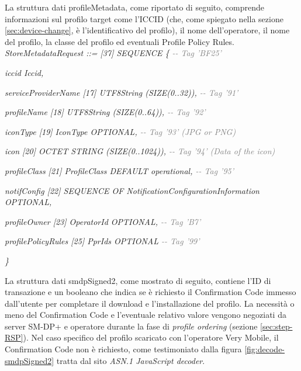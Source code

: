\documentclass[10pt, oneside]{book}
\begin{document}
La struttura dati profileMetadata, come riportato di seguito, comprende informazioni sul profilo target come l'ICCID (che, come spiegato nella sezione \ref{sec:device-change}, è l'identificativo del profilo), il nome dell'operatore, il nome del profilo, la classe del profilo ed eventuali Profile Policy Rules.\\

\textit{StoreMetadataRequest ::= [37] SEQUENCE \{ \textcolor{gray}{{-}{-} Tag 'BF25'}}

\hspace{0.75cm} \textit{iccid Iccid,}

\hspace{0.75cm} \textit{serviceProviderName [17] UTF8String (SIZE(0..32)), \textcolor{gray}{{-}{-} Tag '91'}}

\hspace{0.75cm} \textit{profileName [18] UTF8String (SIZE(0..64)), \textcolor{gray}{{-}{-} Tag '92'}}

\hspace{0.75cm} \textit{iconType [19] IconType OPTIONAL, \textcolor{gray}{{-}{-} Tag '93' (JPG or PNG)}}

\hspace{0.75cm} \textit{icon [20] OCTET STRING (SIZE(0..1024)), \textcolor{gray}{{-}{-} Tag '94' (Data of the icon)}}

\hspace{0.75cm} \textit{profileClass [21] ProfileClass DEFAULT operational, \textcolor{gray}{{-}{-} Tag '95'}}

\hspace{0.75cm} \textit{notifConfig [22] SEQUENCE OF NotificationConfigurationInformation OPTIONAL,}

\hspace{0.75cm} \textit{profileOwner [23] OperatorId OPTIONAL, \textcolor{gray}{{-}{-} Tag 'B7'}}

\hspace{0.75cm} \textit{profilePolicyRules [25] PprIds OPTIONAL \textcolor{gray}{{-}{-} Tag '99'}}

\textit{\}\\}

La struttura dati smdpSigned2, come mostrato di seguito, contiene l'ID di transazione e un booleano che indica se è richiesto il Confirmation Code immesso dall'utente per completare il download e l'installazione del profilo. La necessità o meno del Confirmation Code e l'eventuale relativo valore vengono negoziati da server SM-DP+ e operatore durante la fase di \textit{profile ordering} (sezione \ref{sec:step-RSP}). Nel caso specifico del profilo scaricato con l'operatore Very Mobile, il Confirmation Code non è richiesto, come testimoniato dalla figura \ref{fig:decode-smdpSigned2} tratta dal sito \textit{ASN.1 JavaScript decoder}.\\
\end{document}
